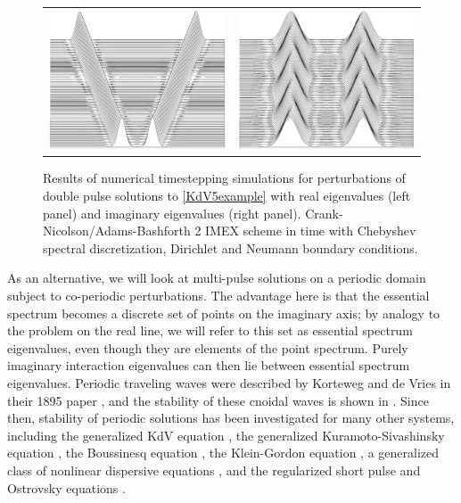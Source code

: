 \documentclass[12pt]{elsarticle}
\theoremstyle{plain}
\theoremstyle{definition}
\theoremstyle{remark}
\numberwithin{theorem}{section}
\numberwithin{equation}{section}
\begin{document}
\begin{figure}
\begin{center}
\begin{tabular}{cc}
\includegraphics[width=8cm]{images/waterfallunstable.eps} &
\includegraphics[width=8cm]{images/waterfallstable.eps}
\vspace{-0.25cm}
\end{tabular}
\end{center}
\caption{Results of numerical timestepping simulations for perturbations of double pulse solutions to \cref{KdV5example} with real eigenvalues (left panel) and imaginary eigenvalues (right panel). Crank-Nicolson/Adams-Bashforth 2 IMEX scheme in time with Chebyshev spectral discretization, Dirichlet and Neumann boundary conditions.}
\label{fig:KdV5waterfall}
\end{figure}

As an alternative, we will look at multi-pulse solutions on a periodic domain subject to co-periodic perturbations. The advantage here is that the essential spectrum becomes a discrete set of points on the imaginary axis; by analogy to the problem on the real line, we will refer to this set as essential spectrum eigenvalues, even though they are elements of the point spectrum. Purely imaginary interaction eigenvalues can then lie between essential spectrum eigenvalues. Periodic traveling waves were described by Korteweg and de Vries in their 1895 paper \cite{KdVoriginal}, and the stability of these cnoidal waves is shown in \cite{Pava2006,Bottman2009}. Since then, stability of periodic solutions has been investigated for many other systems, including the generalized KdV equation \cite{Johnson2009}, the generalized Kuramoto-Sivashinsky equation \cite{Barker2013}, the Boussinesq equation \cite{Hakkaev2014}, the Klein-Gordon equation \cite{Demirkaya2015}, a generalized class of nonlinear dispersive equations \cite{Hur2015}, and the regularized short pulse and Ostrovsky equations \cite{Hakkaev2017}. 
\end{document}
